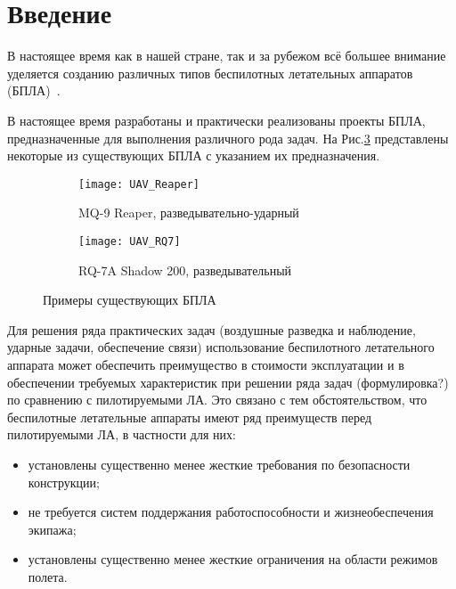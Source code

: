 \chapter*{Введение}

В настоящее время как в нашей стране, так и за рубежом всё большее внимание уделяется созданию различных типов беспилотных летательных аппаратов (БПЛА)~\cite{UAVBook}. 


В настоящее время разработаны и практически реализованы проекты БПЛА, предназначенные для выполнения различного рода задач. На Рис.\ref{fig:UAVs} представлены некоторые из существующих БПЛА с указанием их предназначения.


\begin{figure}[H]
        \begin{subfigure}[b]{0.47\textwidth}
                \texttt{[image: UAV\_Reaper]}
                \caption{MQ-9 Reaper, разведывательно-ударный} %
                \label{fig:UAV_Reaper}
        \end{subfigure}%
        \hspace{\fill}
        \begin{subfigure}[b]{0.47\textwidth}
                \texttt{[image: UAV\_RQ7]}
                \caption{RQ-7A Shadow 200, разведывательный}
                \label{fig:UAV_RQ7}
        \end{subfigure}
        \caption{Примеры существующих БПЛА}\label{fig:UAVs}
\end{figure}

Для решения ряда практических задач (воздушные разведка и наблюдение, ударные задачи, обеспечение связи) использование беспилотного летательного аппарата может обеспечить преимущество в стоимости эксплуатации и в обеспечении требуемых характеристик при решении ряда задач (формулировка?) по сравнению с пилотируемыми ЛА. Это связано с тем обстоятельством, что беспилотные летательные аппараты имеют ряд преимуществ перед пилотируемыми ЛА, в частности для них:

\begin{itemize}
\item установлены существенно менее жесткие требования по безопасности конструкции;
\item не требуется систем поддержания работоспособности и жизнеобеспечения экипажа;
\item установлены существенно менее жесткие ограничения на области режимов полета.
\end{itemize} 

